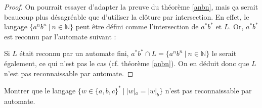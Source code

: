 \begin{proof}
On pourrait essayer d'adapter la preuve du théorème \ref{anbn}, mais ça serait beaucoup plus désagréable que d'utiliser la clôture par intersection. En effet, le langage $\{a^nb^n ~|~n \in \mathbb{N}\}$ peut être défini comme l'intersection de $a^*b^*$ et $L$. Or, $a^*b^*$ est reconnu par l'automate suivant :


\begin{figure}[H]
\centering
{}
\end{figure} 

Si $L$ était reconnu par un automate fini, $a^*b^* \cap L = \{a^nb^n ~|~ n \in \mathbb{N}\}$ le serait également, ce qui n'est pas le cas (cf. théorème \ref{anbn}). On en déduit donc que $L$ n'est pas reconnaissable par automate.

\end{proof}

\begin{exercice}
Montrer que le langage $\{w \in \{a,b,c\}^* ~|~ |w|_a = |w|_b\}$ n'est pas reconnaissable par automate.
\end{exercice}
